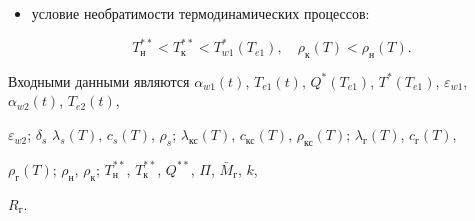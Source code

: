 \begin{itemize}
начальные условия для температуры и подвижных границ:

\begin{equation}

\label{kuzn11:eq21}

\begin{array}{c}

T(x,\,0)=T_\text{н} (x),

\quad

x_0 <x<x_{w1},

\quad

t=0;

\\

x_\text{н}^{\ast \ast} (0)=x_\text{к}^{\ast \ast} (0)=x_{w1}^\ast (0)=x_{w1};

\end{array}

\end{equation}



\item условие необратимости термодинамических процессов:

\begin{equation}

\label{kuzn11:eq22}

T_\text{н}^{\ast \ast } <T_\text{к}^{\ast \ast } <T_{w1}^\ast (T_{e1}),

\quad

\rho_\text{к} (T)<\rho_\text{н} (T).

\end{equation}

\end{itemize}





Входными данными являются  $\alpha _{w1} (t)$, $T_{e1} (t)$, $Q^\ast (T_{e1})$, $T^\ast (T_{e1})$, $\varepsilon_{w1} $, $\alpha _{w2} (t)$, $T_{e2} (t)$,

$\varepsilon _{w2} $; $\delta _s$  $\lambda _s(T)$, $c_s (T)$, $\rho _s $; $\lambda _\text{кс} ( T )$, $c_\text{кс}( T )$, $\rho _\text{кс} (T)$; $\lambda_\text{г} ( T )$, $c_\text{г} ( T )$,

$\rho _\text{г} ( T )$; $\rho_\text{н}$, $\rho_\text{к}$; $T_\text{н}^{\ast \ast}$, $T_\text{к}^{\ast \ast}$, $Q^{\ast \ast } $, $\Pi $, $\bar {M}_\text{г} $, $k$,

$R_\text{г}$.



\smallskip



